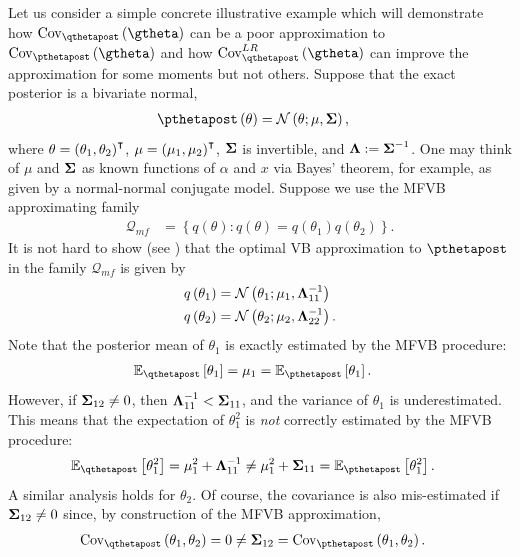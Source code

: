 \documentclass{article}\usepackage[]{graphicx}\usepackage[]{color}
\theoremstyle{plain}
\theoremstyle{definition}
\theoremstyle{plain}
\theoremstyle{plain}
\theoremstyle{plain}
\theoremstyle{plain}
\begin{document}
Let us consider a simple concrete illustrative example which will
demonstrate how $\cov_{\qthetapost}\left(\gtheta\right)$ can be a
poor approximation to $\textrm{Cov}_{\pthetapost}\left(\gtheta\right)$
and how $\lrvbcov\left(\gtheta\right)$ can improve the approximation
for some moments but not others. Suppose that the exact posterior
is a bivariate normal,
\begin{align}
\pthetapost\left(\theta\right) & =\mathcal{N}\left(\theta;\mu,\covmat\right),\label{eq:normal_example}
\end{align}
where $\theta=\left(\theta_{1},\theta_{2}\right)^{\intercal}$, $\mu=\left(\mu_{1},\mu_{2}\right)^{\intercal}$,
$\boldsymbol{\Sigma}$ is invertible, and $\boldsymbol{\Lambda}:=\boldsymbol{\Sigma}^{-1}$. One may think
of $\mu$ and $\boldsymbol{\Sigma}$ as known functions of $\alpha$ and $x$
via Bayes' theorem, for example, as given by a normal-normal conjugate
model. Suppose we use the MFVB approximating family
\begin{align*}
\mathcal{Q}_{mf} & =\left\{ q\left(\theta\right):q\left(\theta\right)=q\left(\theta_{1}\right)q\left(\theta_{2}\right)\right\} .
\end{align*}
It is not hard to show (see ) that the optimal
VB approximation to $\pthetapost$ in the family $\mathcal{Q}_{mf}$
is given by
\begin{align*}
q\left(\theta_{1}\right) & =\mathcal{N}\left(\theta_{1};\mu_{1},\boldsymbol{\Lambda}_{11}^{-1}\right)\\
q\left(\theta_{2}\right) & =\mathcal{N}\left(\theta_{2};\mu_{2},\boldsymbol{\Lambda}_{22}^{-1}\right).
\end{align*}
Note that the posterior mean of $\theta_{1}$ is exactly estimated
by the MFVB procedure:
\begin{align*}
\mbeq\left[\theta_{1}\right] & =\mu_{1}=\mbep\left[\theta_{1}\right].
\end{align*}
However, if $\boldsymbol{\Sigma}_{12}\ne0$, then $\boldsymbol{\Lambda}_{11}^{-1}<\boldsymbol{\Sigma}_{11}$,
and the variance of $\theta_{1}$ is underestimated. This means that
the expectation of $\theta_{1}^{2}$ is \textit{not} correctly estimated
by the MFVB procedure:
\begin{align*}
\mbeq\left[\theta_{1}^{2}\right] & =\mu_{1}^{2}+\infomat_{11}^{-1}\ne\mu_{1}^{2}+\covmat_{11}=\mbep\left[\theta_{1}^{2}\right].
\end{align*}
A similar analysis holds for $\theta_{2}$. Of course, the covariance
is also mis-estimated if $\boldsymbol{\Sigma}_{12}\ne0$ since, by construction
of the MFVB approximation,
\begin{align*}
\cov_{\qthetapost}\left(\theta_{1},\theta_{2}\right) & =0\ne\covmat_{12}=\cov_{\pthetapost}\left(\theta_{1},\theta_{2}\right).
\end{align*}
\end{document}
